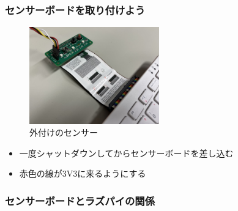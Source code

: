 \begin{frame}
  \frametitle{センサーボードを取り付けよう}
  \begin{figure}
    \centering
    \includegraphics[width=0.5\textwidth]{../images/chap03/how_to_install_bme280.jpg}
    \caption{外付けのセンサー}
  \end{figure}
  \begin{itemize}
    \item 一度シャットダウンしてからセンサーボードを差し込む
    \item 赤色の線が3V3に来るようにする
  \end{itemize}
\end{frame}

\begin{frame}
  \frametitle{センサーボードとラズパイの関係}
  \begin{figure}
    
\end{figure}
\end{frame}




